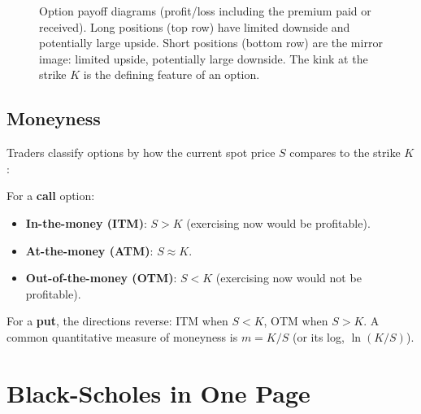 \begin{figure}[htbp]
\caption{Option payoff diagrams (profit/loss including the premium paid or received).
Long positions (top row) have limited downside and potentially large upside.
Short positions (bottom row) are the mirror image: limited upside, potentially large downside.
The kink at the strike $K$ is the defining feature of an option.}
\label{fig:payoff-diagrams}
\end{figure}

\subsection{Moneyness}
\label{sec:moneyness}

Traders classify options by how the current spot price $S$ compares to the strike $K$:

\begin{definition}[Moneyness]
For a \textbf{call} option:
\begin{itemize}[nosep]
  \item \textbf{In-the-money (ITM)}: $S > K$ (exercising now would be profitable).
  \item \textbf{At-the-money (ATM)}: $S \approx K$.
  \item \textbf{Out-of-the-money (OTM)}: $S < K$ (exercising now would not be profitable).
\end{itemize}
For a \textbf{put}, the directions reverse: ITM when $S < K$, OTM when $S > K$.
A common quantitative measure of moneyness is $m = K/S$ (or its log, $\ln(K/S)$).
\end{definition}


\section{Black-Scholes in One Page}
\label{sec:black-scholes}


